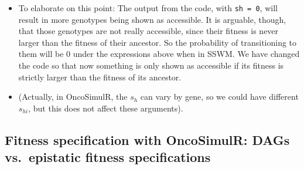 \documentclass[11pt]{article}
\begin{document}
\begin{itemize}
\item To elaborate on this point: The output from the code, with \texttt{sh = 0}, will result in more genotypes being shown as accessible. It is arguable, though, that those genotypes are not really accessible, since their fitness is never larger than the fitness of their ancestor. So the probability of transitioning to them will be 0 under the expressions above when in SSWM. We have changed the code so that now something is only shown as accessible if its fitness is strictly larger than the fitness of its ancestor.

\item (Actually, in OncoSimulR, the \(s_h\) can vary by gene, so we could have different \(s_{hi}\), but this does not affect these arguments).
\end{itemize}


\subsection{Fitness specification with OncoSimulR: DAGs vs.\ epistatic fitness specifications}
\label{sec:orgcea5033}
\end{document}
